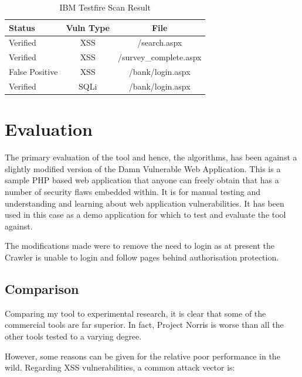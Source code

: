 \documentclass[12pt,a4paper]{article}
\begin{document}
\begin{center}
    \begin{table}
        \caption{IBM Testfire Scan Result}
        \begin{center}
            \begin{tabular}{ | l | c | c | }
                \hline
                Status & Vuln Type & File \\ \hline
                Verified & XSS & /search.aspx \\ \hline
                Verified & XSS & /survey\_complete.aspx \\ \hline
                False Positive & XSS & /bank/login.aspx \\ \hline
                Verified & SQLi & /bank/login.aspx \\ 
                \hline
            \end{tabular}
        \end{center}
    \end{table}
\end{center}

\section{Evaluation}
The primary evaluation of the tool and hence, the algorithms, has been against a slightly modified version of the Damn Vulnerable Web Application.  This is a sample PHP based web application that anyone can freely obtain that has a number of security flaws embedded within.  It is for manual testing and understanding and learning about web application vulnerabilities.  It has been used in this case as a demo application for which to test and evaluate the tool against.

The modifications made were to remove the need to login as at present the Crawler is unable to login and follow pages behind authorisation protection.

\subsection{Comparison}
Comparing my tool to experimental research, it is clear that some of the commercial tools are far superior. In fact, Project Norris is worse than all the other tools tested to a varying degree. \cite{Suto2010}

However, some reasons can be given for the relative poor performance in the wild. Regarding XSS vulnerabilities, a common attack vector is:
\end{document}
